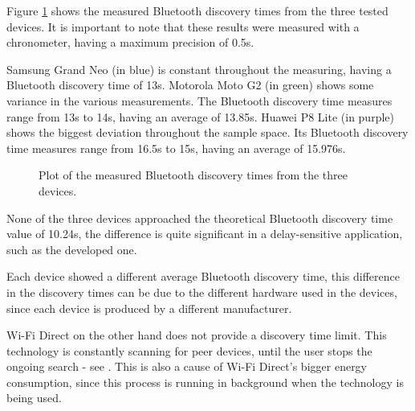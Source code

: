 Figure \ref{fig:normaldisc} shows the measured Bluetooth discovery times from the three tested devices. It is important to note that these results were measured with a chronometer, having a maximum precision of 0.5s.

Samsung Grand Neo (in blue) is constant throughout the measuring, having a Bluetooth discovery time of 13s. Motorola Moto G2 (in green) shows some variance in the various measurements. The Bluetooth discovery time measures range from 13s to 14s, having an average of 13.85s. Huawei P8 Lite (in purple) shows the biggest deviation throughout the sample space. Its Bluetooth discovery time measures range from 16.5s to 15s, having an average of 15.976s.

\begin{figure}[ht]
	\noindent{}
	\caption{\label{fig:normaldisc} Plot of the measured Bluetooth discovery times from the three devices.}
\end{figure}

None of the three devices approached the theoretical Bluetooth discovery time value of 10.24s, the difference is quite significant in a delay-sensitive application, such as the developed one.

Each device showed a different average Bluetooth discovery time, this difference in the discovery times can be due to the different hardware used in the devices, since each device is produced by a different manufacturer.

Wi-Fi Direct on the other hand does not provide a discovery time limit. This technology is constantly scanning for peer devices, until the user stops the ongoing search - see \cite{wfddisc}. This is also a cause of Wi-Fi Direct's bigger energy consumption, since this process is running in background when the technology is being used.

